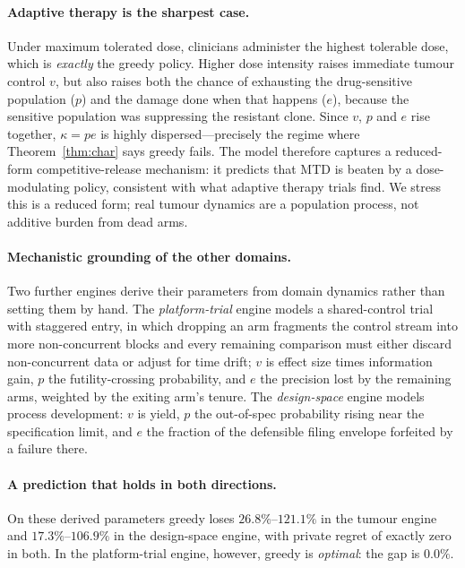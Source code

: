 \paragraph{Adaptive therapy is the sharpest case.} Under maximum tolerated dose,
clinicians administer the highest tolerable dose, which is \emph{exactly} the greedy
policy. Higher dose intensity raises immediate tumour control $v$, but also raises
both the chance of exhausting the drug-sensitive population ($p$) and the damage
done when that happens ($e$), because the sensitive population was suppressing the
resistant clone. Since $v$, $p$ and $e$ rise together, $\kappa = pe$ is highly
dispersed---precisely the regime where Theorem~\ref{thm:char} says greedy fails. The
model therefore captures a reduced-form competitive-release mechanism: it
predicts that MTD is beaten by a dose-modulating policy, consistent with what adaptive
therapy trials find. We stress this is a reduced form; real tumour dynamics are a
population process, not additive burden from dead arms.

\paragraph{Mechanistic grounding of the other domains.} Two further engines derive
their parameters from domain dynamics rather than setting them by hand. The
\emph{platform-trial} engine models a shared-control trial with staggered entry, in
which dropping an arm fragments the control stream into more non-concurrent blocks
and every remaining comparison must either discard non-concurrent data or adjust for
time drift; $v$ is effect size times information gain, $p$ the futility-crossing
probability, and $e$ the precision lost by the remaining arms, weighted by the
exiting arm's tenure. The \emph{design-space} engine models process development:
$v$ is yield, $p$ the out-of-spec probability rising near the specification limit,
and $e$ the fraction of the defensible filing envelope forfeited by a failure there.

\label{sec:alignment}
\paragraph{A prediction that holds in both directions.} On these derived parameters
greedy loses $26.8\%$--$121.1\%$ in the tumour engine and $17.3\%$--$106.9\%$ in the
design-space engine, with private regret of exactly zero in both. In the
platform-trial engine, however, greedy is \emph{optimal}: the gap is $0.0\%$.

